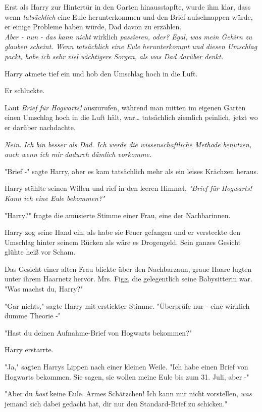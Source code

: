 {Erst als Harry zur Hintertür in den Garten hinausstapfte, wurde ihm klar, dass wenn \emph{tatsächlich} eine Eule herunterkommen und den Brief aufschnappen würde, er einige Probleme haben würde, Dad davon zu erzählen.\\ \emph{Aber - nun - das kann nicht} wirklich \emph{passieren, oder? Egal, was mein Gehirn zu glauben scheint. Wenn tatsächlich eine Eule herunterkommt und diesen Umschlag packt, habe ich sehr viel wichtigere Sorgen, als was Dad darüber denkt.}

Harry atmete tief ein und hob den Umschlag hoch in die Luft.

Er schluckte.

Laut \emph{Brief für Hogwarts!} auszurufen, während man mitten im eigenen Garten einen Umschlag hoch in die Luft hält, war… tatsächlich ziemlich peinlich, jetzt wo er darüber nachdachte.

\emph{Nein. Ich bin besser als Dad. Ich werde die wissenschaftliche Methode benutzen, auch wenn ich mir dadurch dämlich vorkomme.}

"Brief -" sagte Harry, aber es kam tatsächlich mehr als ein leises Krächzen heraus.

Harry stählte seinen Willen und rief in den leeren Himmel, \emph{"Brief für Hogwarts! Kann ich eine Eule bekommen?"}

"Harry?" fragte die amüsierte Stimme einer Frau, eine der Nachbarinnen.

Harry zog seine Hand ein, als habe sie Feuer gefangen und er versteckte den Umschlag hinter seinem Rücken als wäre es Drogengeld. Sein ganzes Gesicht glühte heiß vor Scham.

Das Gesicht einer alten Frau blickte über den Nachbarzaun, graue Haare lugten unter ihrem Haarnetz hervor. Mrs. Figg, die gelegentlich seine Babysitterin war. "Was machst du, Harry?"

"Gar nichts," sagte Harry mit erstickter Stimme. "Überprüfe nur - eine wirklich dumme Theorie -"

"Hast du deinen Aufnahme-Brief von Hogwarts bekommen?"

Harry erstarrte.

"Ja," sagten Harrys Lippen nach einer kleinen Weile. "Ich habe einen Brief von Hogwarts bekommen. Sie sagen, sie wollen meine Eule bis zum 31. Juli, aber -"

"Aber du \emph{hast} keine Eule. Armes Schätzchen! Ich kann mir nicht vorstellen, \emph{was} jemand sich dabei gedacht hat, dir nur den Standard-Brief zu schicken."

}
